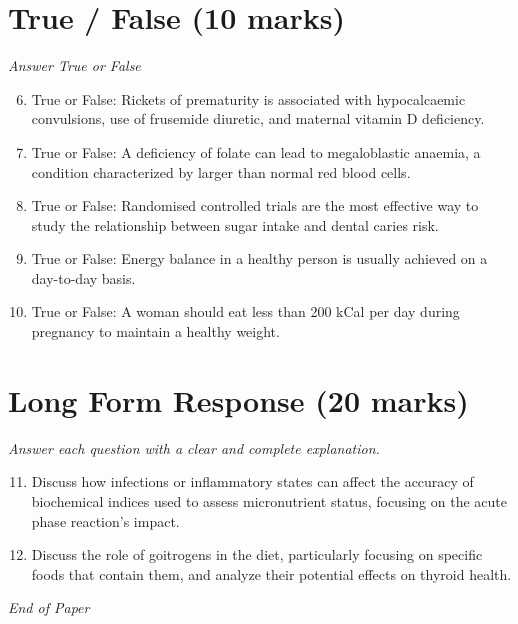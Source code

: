 \documentclass[12pt]{article}
\begin{document}
\section*{True / False (10 marks)}
\textit{Answer True or False}
\begin{enumerate}[label=\arabic*.]
\setcounter{enumi}{5}
\item True or False: Rickets of prematurity is associated with hypocalcaemic convulsions, use of frusemide diuretic, and maternal vitamin D deficiency.
\item True or False: A deficiency of folate can lead to megaloblastic anaemia, a condition characterized by larger than normal red blood cells.
\item True or False: Randomised controlled trials are the most effective way to study the relationship between sugar intake and dental caries risk.
\item True or False: Energy balance in a healthy person is usually achieved on a day-to-day basis.
\item True or False: A woman should eat less than 200 kCal per day during pregnancy to maintain a healthy weight.
\end{enumerate}

\section*{Long Form Response (20 marks)}
\textit{Answer each question with a clear and complete explanation.}
\begin{enumerate}[label=\arabic*.]
\setcounter{enumi}{10}
\item Discuss how infections or inflammatory states can affect the accuracy of biochemical indices used to assess micronutrient status, focusing on the acute phase reaction's impact.
\item Discuss the role of goitrogens in the diet, particularly focusing on specific foods that contain them, and analyze their potential effects on thyroid health.
\end{enumerate}

\vfill
\noindent\textit{End of Paper}
\end{document}
